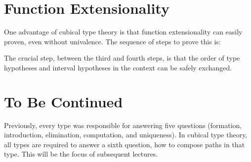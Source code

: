 \documentclass[11pt]{article}
\begin{document}
\section{Function Extensionality}
One advantage of cubical type theory is that function extensionality can easily proven, even without univalence. The sequence of steps to prove this is:

\begin{prooftree*}
\end{prooftree*}

The crucial step, between the third and fourth steps, is that the order of type hypotheses and interval hypotheses in the context can be safely exchanged.

\section{To Be Continued}
Previously, every type was responsible for answering five questions (formation, introduction, elimination, computation, and uniqueness). In cubical type theory, all types are required to answer a sixth question, how to compose paths in that type. This will be the focus of subsequent lectures.
\end{document}
